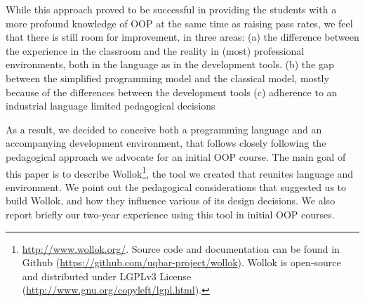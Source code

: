 While this approach proved to be successful in providing the students with a more profound knowledge of OOP at the same time as raising pass rates, 
we feel that there is still room for improvement, in three areas:
(a) the difference between the experience in the classroom and the reality in (most) professional environments, both in the language as in the development tools.
(b) the gap between the simplified programming model and the classical model, mostly because of the differences between the development tools
(c) adherence to an industrial language limited pedagogical decisions

As a result, we decided to conceive both a programming language and an accompanying development environment, that follows closely following the pedagogical approach we advocate for an initial OOP course. 
The main goal of this paper is to describe Wollok\footnote{
	\url{http://www.wollok.org/}. 
	Source code and documentation can be found in Github 
	(\url{https://github.com/uqbar-project/wollok}).
	Wollok is open-source and distributed under LGPLv3 License 
	(\url{http://www.gnu.org/copyleft/lgpl.html}).}, 
the tool we created that reunites language and environment. We point out the pedagogical considerations that suggested us to build Wollok, and how they influence various of its design decisions. We also report briefly our two-year experience using this tool in initial OOP courses.


